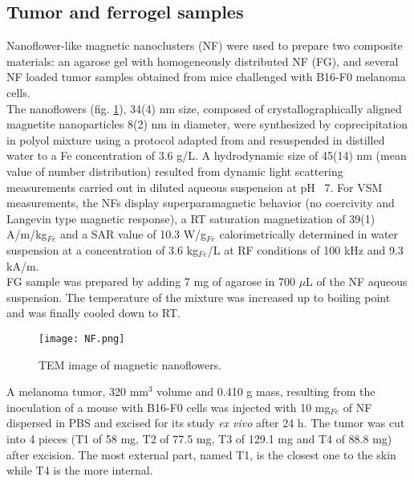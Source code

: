 \documentclass[preprint,12pt]{elsarticle}
\begin{document}
\subsection{Tumor and ferrogel samples}
Nanoflower-like magnetic nanoclusters (NF) were used to prepare two composite materials: an agarose gel with homogeneously distributed NF (FG), and several NF loaded tumor samples obtained from mice challenged with B16-F0 melanoma cells.\\    
The nanoflowers (fig. \ref{NF}),  34(4) nm size,  composed of crystallographically aligned magnetite nanoparticles 8(2) nm in diameter, were synthesized by coprecipitation in polyol mixture using a protocol adapted from \cite{hugounenq2012iron} and resuspended in distilled water to a Fe concentration of 3.6 g/L. A hydrodynamic size of 45(14) nm (mean value of number distribution) resulted from dynamic light scattering measurements carried out in diluted aqueous suspension at pH ~7. For VSM measurements, the NFs display superparamagnetic behavior (no coercivity and Langevin type magnetic response), a RT saturation magnetization of  39(1) A/m/kg$_{Fe}$ and a SAR value of 10.3 W/g$_{Fe}$ calorimetrically determined in water suspension at a concentration of 3.6 kg$_{Fe}$/L at RF conditions of 100 kHz and 9.3 kA/m.\\
FG sample was prepared by adding 7 mg of agarose in 700 $\mu$L of the NF aqueous suspension. The temperature of the mixture was increased up to boiling point and was finally cooled down to RT.\\
\begin{figure}
    \centering
    \texttt{[image: NF.png]}
    \caption{TEM image of magnetic nanoflowers.}
    \label{NF}
\end{figure}
A melanoma tumor, 320 mm$^3$ volume and 0.410 g mass, resulting from the inoculation of a mouse with B16-F0 cells was injected with 10 mg$_{Fe}$ of NF dispersed in PBS and excised for its study \textit{ex vivo} after 24 h. The tumor was cut into 4 pieces (T1 of 58 mg, T2 of 77.5 mg, T3 of 129.1 mg and T4 of 88.8 mg) after excision. The most external part, named T1, is the closest one to the skin while T4 is the more internal.
\end{document}
